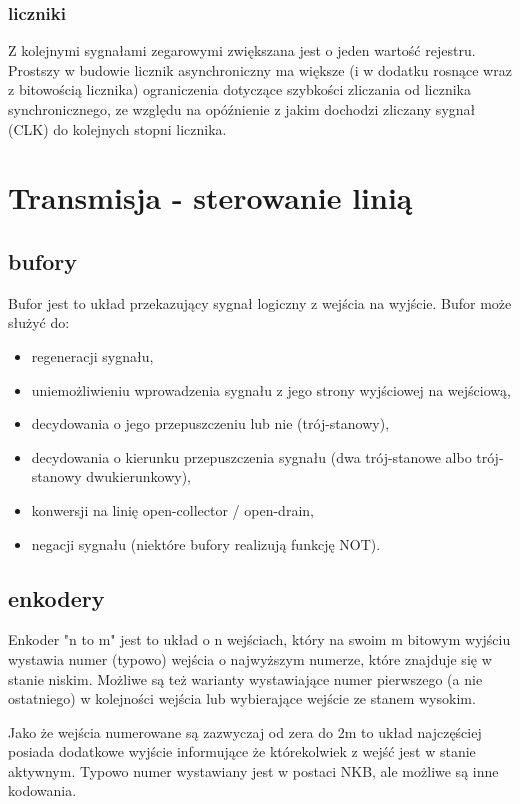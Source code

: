 \documentclass{pdfBooklets}
\begin{document}
\subsubsection{liczniki}
Z kolejnymi sygnałami zegarowymi zwiększana jest o jeden wartość rejestru. Prostszy w budowie licznik asynchroniczny ma większe (i w dodatku rosnące wraz z bitowością licznika) ograniczenia dotyczące szybkości zliczania od licznika synchronicznego, ze względu na opóźnienie z jakim dochodzi zliczany sygnał (CLK) do kolejnych stopni licznika.


\section{Transmisja - sterowanie linią}
\subsection{bufory}

Bufor jest to układ przekazujący sygnał logiczny z wejścia na wyjście. Bufor może służyć do:
\begin{itemize}
\item regeneracji sygnału,
\item uniemożliwieniu wprowadzenia sygnału z jego strony wyjściowej na wejściową,
\item decydowania o jego przepuszczeniu lub nie (trój-stanowy),
\item decydowania o kierunku przepuszczenia sygnału (dwa trój-stanowe albo trój-stanowy dwukierunkowy),
\item konwersji na linię open-collector / open-drain,
\item negacji sygnału (niektóre bufory realizują funkcję NOT).
\end{itemize}

\subsection{enkodery}

Enkoder "n to m" jest to układ o n wejściach, który na swoim m bitowym wyjściu wystawia numer (typowo) wejścia o najwyższym numerze, które znajduje się w stanie niskim. Możliwe są też warianty wystawiające numer pierwszego (a nie ostatniego) w kolejności wejścia lub wybierające wejście ze stanem wysokim.

Jako że wejścia numerowane są zazwyczaj od zera do 2m to układ najczęściej posiada dodatkowe wyjście informujące że którekolwiek z wejść jest w stanie aktywnym. Typowo numer wystawiany jest w postaci NKB, ale możliwe są inne kodowania.
\end{document}
